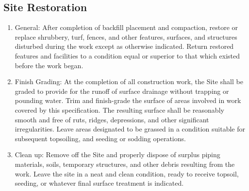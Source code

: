 \documentclass{article}%
\begin{document}
%
\subsection{Site Restoration}%
\label{subsec:SiteRestoration}%
\begin{enumerate}[label=\alph*),start=1]%
\item%
General: After completion of backfill placement and compaction, restore or replace shrubbery, turf, fences, and other features, surfaces, and structures disturbed during the work except as otherwise indicated. Return restored features and facilities to a condition equal or superior to that which existed before the work began.%
\item%
Finish Grading: At the completion of all construction work, the Site shall be graded to provide for the runoff of surface drainage without trapping or pounding water. Trim and finish{-}grade the surface of areas involved in work covered by this specification. The resulting surface shall be reasonably smooth and free of ruts, ridges, depressions, and other significant irregularities. Leave areas designated to be grassed in a condition suitable for subsequent topsoiling, and seeding or sodding operations.%
\item%
Clean up: Remove off the Site and properly dispose of surplus piping materials, soils, temporary structures, and other debris resulting from the work. Leave the site in a neat and clean condition, ready to receive topsoil, seeding, or whatever final surface treatment is indicated.%
\end{enumerate}

%
\end{document}
